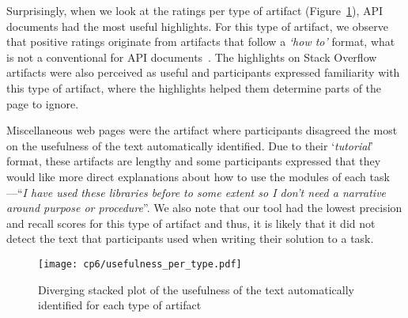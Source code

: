 Surprisingly, when we look at the ratings per type of artifact (Figure~\ref{fig:usefulness-by-artifact-type}), API documents had the most useful highlights.
For this type of artifact, we observe that positive ratings originate from artifacts that follow a \textit{`how to'} format,
what is not a conventional for API documents~\cite{robillard2011field, arya2020}. The highlights on Stack Overflow artifacts were also perceived as useful
and participants expressed familiarity with this type of artifact, where the highlights helped them determine parts of the page to ignore.


Miscellaneous web pages were the artifact where participants disagreed the most on the usefulness of the text automatically identified.
Due to their `\textit{tutorial}' format, these artifacts are lengthy and some participants expressed that they would like more direct explanations about how to use the modules of each task---``\textit{I have used these libraries before to some extent so I don't need a narrative around purpose or procedure}''. We also note that our tool had the lowest precision and recall scores 
for this type of artifact and thus, it is likely that it did not detect the text that participants used when writing their solution to a task.





\begin{figure}
    \centering
    \texttt{[image: cp6/usefulness\_per\_type.pdf]}
    \caption{Diverging stacked plot of the usefulness of the text automatically identified for each type of artifact}
    \label{fig:usefulness-by-artifact-type}
\end{figure}
























